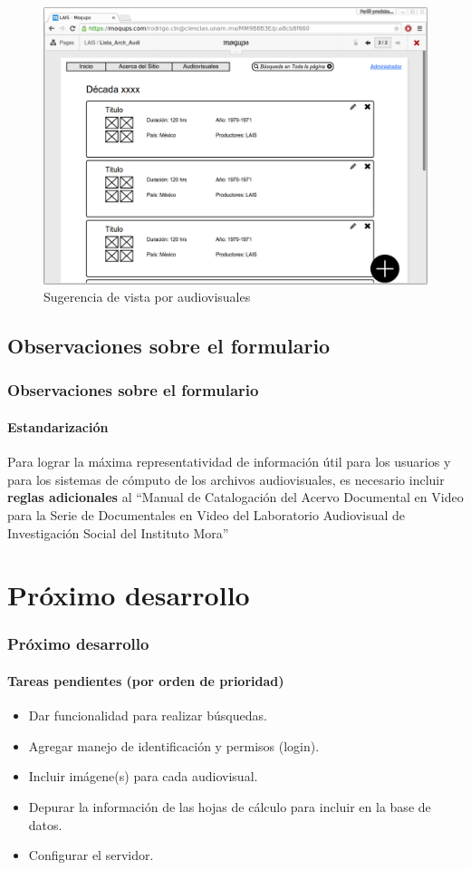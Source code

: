 \documentclass{beamer}
\begin{document}
\begin{frame}
	\begin{figure}[H]
		\centering
		\includegraphics[keepaspectratio=true,width=\linewidth]{Prototipo_09.png}
		\caption{Sugerencia de vista por audiovisuales}
		\label{fig:protipo_angular}
	\end{figure}	
\end{frame}

\subsection{Observaciones sobre el formulario}
\begin{frame}
	\frametitle{Observaciones sobre el formulario}
	\framesubtitle{Estandarización}
	Para lograr la máxima representatividad de información útil para los usuarios y para los sistemas de cómputo de los archivos audiovisuales, es necesario incluir \textbf{reglas adicionales} al ``Manual de Catalogación del Acervo Documental en Video para la Serie de Documentales en Video del Laboratorio Audiovisual de Investigación Social del Instituto Mora''
\end{frame}

\section{Próximo desarrollo}
\begin{frame}
	\frametitle{Próximo desarrollo}
	\framesubtitle{Tareas pendientes (por orden de prioridad)}
	\begin{itemize}
		\item Dar funcionalidad para realizar búsquedas.
		\item Agregar manejo de identificación y permisos (login).
		\item Incluir imágene(s) para cada audiovisual.
		\item Depurar la información de las hojas de cálculo para incluir en la base de datos.
		\item Configurar el servidor.
	\end{itemize}
\end{frame}
\end{document}
